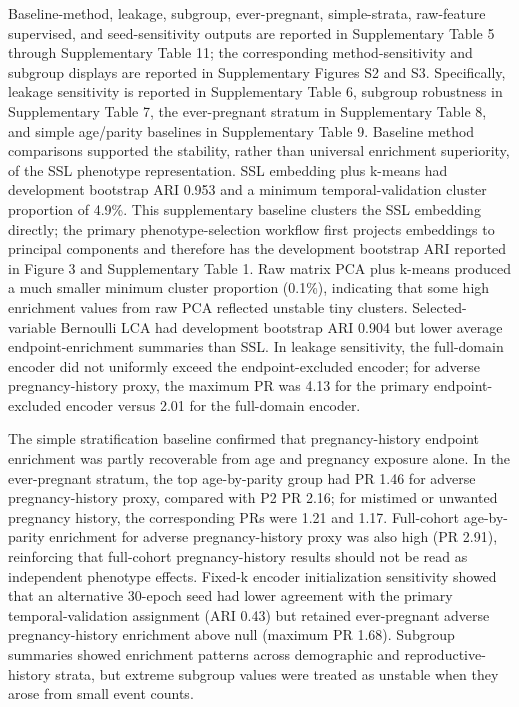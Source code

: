 \documentclass[referee,pdflatex,sn-basic,Numbered]{sn-jnl}
\begin{document}
Baseline-method, leakage, subgroup, ever-pregnant, simple-strata, raw-feature supervised, and seed-sensitivity outputs are reported in Supplementary Table 5 through Supplementary Table 11; the corresponding method-sensitivity and subgroup displays are reported in Supplementary Figures S2 and S3. Specifically, leakage sensitivity is reported in Supplementary Table 6, subgroup robustness in Supplementary Table 7, the ever-pregnant stratum in Supplementary Table 8, and simple age/parity baselines in Supplementary Table 9. Baseline method comparisons supported the stability, rather than universal enrichment superiority, of the SSL phenotype representation. SSL embedding plus k-means had development bootstrap ARI 0.953 and a minimum temporal-validation cluster proportion of 4.9\%. This supplementary baseline clusters the SSL embedding directly; the primary phenotype-selection workflow first projects embeddings to principal components and therefore has the development bootstrap ARI reported in Figure 3 and Supplementary Table 1. Raw matrix PCA plus k-means produced a much smaller minimum cluster proportion (0.1\%), indicating that some high enrichment values from raw PCA reflected unstable tiny clusters. Selected-variable Bernoulli LCA had development bootstrap ARI 0.904 but lower average endpoint-enrichment summaries than SSL. In leakage sensitivity, the full-domain encoder did not uniformly exceed the endpoint-excluded encoder; for adverse pregnancy-history proxy, the maximum PR was 4.13 for the primary endpoint-excluded encoder versus 2.01 for the full-domain encoder.

The simple stratification baseline confirmed that pregnancy-history endpoint enrichment was partly recoverable from age and pregnancy exposure alone. In the ever-pregnant stratum, the top age-by-parity group had PR 1.46 for adverse pregnancy-history proxy, compared with P2 PR 2.16; for mistimed or unwanted pregnancy history, the corresponding PRs were 1.21 and 1.17. Full-cohort age-by-parity enrichment for adverse pregnancy-history proxy was also high (PR 2.91), reinforcing that full-cohort pregnancy-history results should not be read as independent phenotype effects. Fixed-k encoder initialization sensitivity showed that an alternative 30-epoch seed had lower agreement with the primary temporal-validation assignment (ARI 0.43) but retained ever-pregnant adverse pregnancy-history enrichment above null (maximum PR 1.68). Subgroup summaries showed enrichment patterns across demographic and reproductive-history strata, but extreme subgroup values were treated as unstable when they arose from small event counts.
\end{document}

